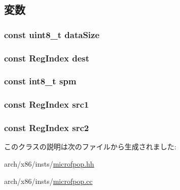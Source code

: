 \subsection{変数}
\hypertarget{classX86ISA_1_1FpOp_a107c258b340f17c2bfd8326ada8441ce}{
\subsubsection[{dataSize}]{\setlength{\rightskip}{0pt plus 5cm}const uint8\_\-t {\bf dataSize}}}
\label{classX86ISA_1_1FpOp_a107c258b340f17c2bfd8326ada8441ce}
\hypertarget{classX86ISA_1_1FpOp_ab74217a19b7ae8f204175991a8087f1e}{
\subsubsection[{dest}]{\setlength{\rightskip}{0pt plus 5cm}const {\bf RegIndex} {\bf dest}}}
\label{classX86ISA_1_1FpOp_ab74217a19b7ae8f204175991a8087f1e}
\hypertarget{classX86ISA_1_1FpOp_a90fe61b3b78b03c3d2089b66581ae927}{
\subsubsection[{spm}]{\setlength{\rightskip}{0pt plus 5cm}const int8\_\-t {\bf spm}}}
\label{classX86ISA_1_1FpOp_a90fe61b3b78b03c3d2089b66581ae927}
\hypertarget{classX86ISA_1_1FpOp_ac0ec0327e65bf2376ccab1d826a7094e}{
\subsubsection[{src1}]{\setlength{\rightskip}{0pt plus 5cm}const {\bf RegIndex} {\bf src1}}}
\label{classX86ISA_1_1FpOp_ac0ec0327e65bf2376ccab1d826a7094e}
\hypertarget{classX86ISA_1_1FpOp_ae5f4f8a3a7b6e717a2cff2990c4ecfff}{
\subsubsection[{src2}]{\setlength{\rightskip}{0pt plus 5cm}const {\bf RegIndex} {\bf src2}}}
\label{classX86ISA_1_1FpOp_ae5f4f8a3a7b6e717a2cff2990c4ecfff}


このクラスの説明は次のファイルから生成されました:\begin{DoxyCompactItemize}
\item 
arch/x86/insts/\hyperlink{microfpop_8hh}{microfpop.hh}\item 
arch/x86/insts/\hyperlink{microfpop_8cc}{microfpop.cc}\end{DoxyCompactItemize}
